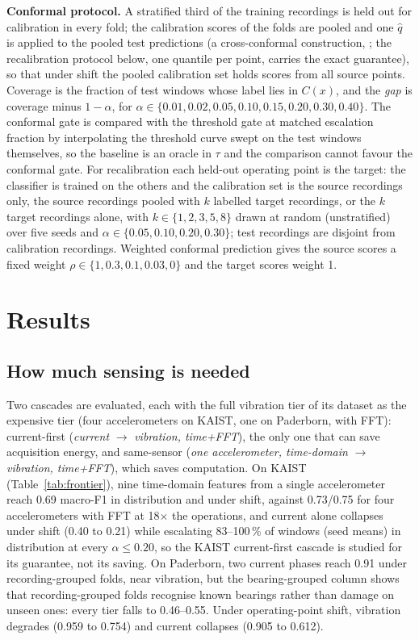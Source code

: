 \documentclass{ifacconf}
\begin{document}
\textbf{Conformal protocol.} A stratified third of the training recordings is held out for calibration in every fold; the calibration scores of the folds are pooled and one $\hat q$ is applied to the pooled test predictions (a cross-conformal construction, \citealp{vovk2015crossconformal}; the recalibration protocol below, one quantile per point, carries the exact guarantee), so that under shift the pooled calibration set holds scores from all source points. Coverage is the fraction of test windows whose label lies in $C(x)$, and the \emph{gap} is coverage minus $1-\alpha$, for $\alpha\in\{0.01,0.02,0.05,0.10,0.15,0.20,0.30,0.40\}$. The conformal gate is compared with the threshold gate at matched escalation fraction by interpolating the threshold curve swept on the test windows themselves, so the baseline is an oracle in $\tau$ and the comparison cannot favour the conformal gate. For recalibration each held-out operating point is the target: the classifier is trained on the others and the calibration set is the source recordings only, the source recordings pooled with $k$ labelled target recordings, or the $k$ target recordings alone, with $k\in\{1,2,3,5,8\}$ drawn at random (unstratified) over five seeds and $\alpha\in\{0.05,0.10,0.20,0.30\}$; test recordings are disjoint from calibration recordings. Weighted conformal prediction gives the source scores a fixed weight $\rho\in\{1,0.3,0.1,0.03,0\}$ and the target scores weight 1.

\section{Results}\label{sec:results}

\subsection{How much sensing is needed}
Two cascades are evaluated, each with the full vibration tier of its dataset as the expensive tier (four accelerometers on KAIST, one on Paderborn, with FFT): current-first (\emph{current} $\to$ \emph{vibration, time+FFT}), the only one that can save acquisition energy, and same-sensor (\emph{one accelerometer, time-domain} $\to$ \emph{vibration, time+FFT}), which saves computation. On KAIST (Table~\ref{tab:frontier}), nine time-domain features from a single accelerometer reach 0.69 macro-F1 in distribution and under shift, against 0.73/0.75 for four accelerometers with FFT at 18$\times$ the operations, and current alone collapses under shift (0.40 to 0.21) while escalating 83--100\,\% of windows (seed means) in distribution at every $\alpha\le0.20$, so the KAIST current-first cascade is studied for its guarantee, not its saving. On Paderborn, two current phases reach 0.91 under recording-grouped folds, near vibration, but the bearing-grouped column shows that recording-grouped folds recognise known bearings rather than damage on unseen ones: every tier falls to 0.46--0.55. Under operating-point shift, vibration degrades (0.959 to 0.754) and current collapses (0.905 to 0.612).
\end{document}
